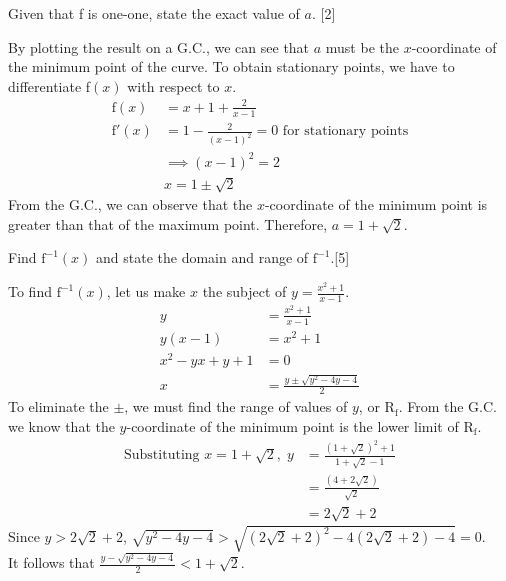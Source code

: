 \documentclass[12pt, a4 paper]{article}
\begin{document}
\begin{outline}[enumerate]
	\2 Given that f is one-one, state the exact value of $a$. \hfill[2]
	\begin{answer}
		By plotting the result on a G.C., we can see that $a$ must be the $x$-coordinate of the minimum point of the curve. To obtain stationary points, we have to differentiate \textrm{f}$(x)$ with respect to $x$.
		\begin{align*}
			\textrm{f}(x)  & =x+1+\frac{2}{x-1}                                       \\
			\textrm{f}'(x) & =1-\frac{2}{(x-1)^2}=0 \textrm{   for stationary points} \\
			               & \implies (x-1)^2=2                                       \\
			               & x=1\pm \sqrt{2}                                          
		\end{align*}
		From the G.C., we can observe that the $x$-coordinate of the minimum point is greater than that of the maximum point. Therefore, $a=1+\sqrt{2}$.
	\end{answer}
	\2 Find $\textrm{f}^{-1}(x)$ and state the domain and range of $\textrm{f}^{-1}$.\hfill[5]
	\begin{answer}
		To find $\textrm{f}^{-1}(x)$, let us make $x$ the subject of $y=\frac{x^2+1}{x-1}$.
		\begin{align*}
			y          & =\frac{x^2+1}{x-1}               \\
			y(x-1)     & =x^2+1                           \\
			x^2-yx+y+1 & =0                               \\
			x          & = \frac{y\pm \sqrt{y^2-4y-4}}{2} 
		\end{align*}
		To eliminate the $\pm$, we must find the range of values of $y$, or $\textrm{R}_{\textrm{f}}$. From the G.C. we know that the $y$-coordinate of the minimum point is the lower limit of $\textrm{R}_{\textrm{f}}$.
		\begin{align*}
			\textrm{Substituting }x=1+\sqrt{2},\; y & =\frac{(1+\sqrt{2})^2+1}{1+\sqrt{2}-1} \\
			                                        & = \frac{(4+2\sqrt{2})}{\sqrt{2}}       \\
			                                        & = 2\sqrt{2}+2                          
		\end{align*}
		Since $y>2\sqrt{2}+2$, $\sqrt{y^2-4y-4}>\sqrt{(2\sqrt{2}+2)^2-4(2\sqrt{2}+2)-4}=0$.\\
		It follows that $\frac{y-\sqrt{y^2-4y-4}}{2}<1+\sqrt{2}$.\\

\end{answer}
\end{outline}
\end{document}
